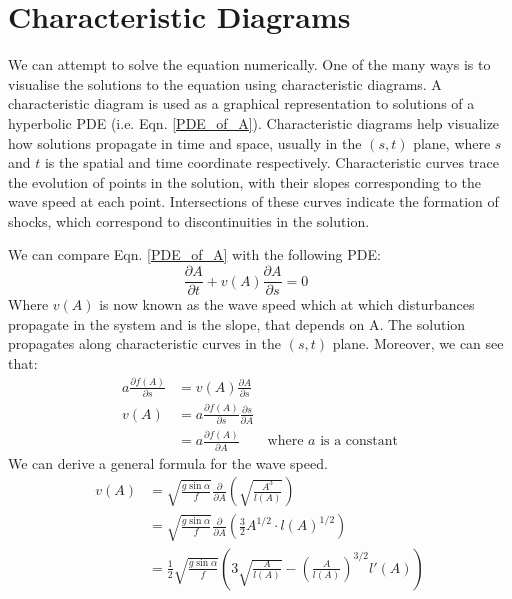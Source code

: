 \documentclass[12pt]{article}
\begin{document}
\section{Characteristic Diagrams}
\label{sec:characteristic}
We can attempt to solve the equation numerically. One of the many ways is to visualise the solutions to the equation using characteristic diagrams. A characteristic diagram is used as a graphical representation to solutions of a hyperbolic PDE (i.e. Eqn. \ref{PDE_of_A}). Characteristic diagrams help visualize how solutions propagate in time and space, usually in the $(s, t)$ plane, where $s$ and $t$ is the spatial and time coordinate respectively. Characteristic curves trace the evolution of points in the solution, with their slopes corresponding to the wave speed at each point. Intersections of these curves indicate the formation of shocks, which correspond to discontinuities in the solution.

We can compare Eqn. \ref{PDE_of_A} with the following PDE:
\begin{equation}
    \frac{\partial A}{\partial t} + v(A) \frac{\partial A}{\partial s} = 0\qquad 
\end{equation}
Where $v(A)$ is now known as the wave speed which at which disturbances propagate in the system and is the slope, that depends on A. The solution propagates along characteristic curves in the $(s, t)$ plane. Moreover, we can see that: 
\begin{equation}
    \begin{split}
        a \frac{\partial f(A)}{\partial s} &= v(A)\frac{\partial A}{\partial s}
        \\ v(A)  &= a \frac{\partial f(A)}{\partial s}\frac{\partial s}{\partial A}
        \\ &= a \frac{\partial f(A)}{\partial A} \qquad \text{where }a\text{ is a constant}
    \end{split}
\end{equation}
We can derive a general formula for the wave speed.
\begin{equation}
    \begin{split}
        v(A) &= \sqrt{\frac{g\sin \alpha}{f}}\frac{\partial}{\partial A}\left( \sqrt{\frac{A^3}{l(A)}}\right)
        \\&= \sqrt{\frac{g\sin \alpha}{f}}\frac{\partial}{\partial A}\left(\frac{3}{2}A^{1/2}\cdot l(A)^{1/2}\right)
        \\&= \frac{1}{2}\sqrt{\frac{g\sin \alpha}{f}}\left(3\sqrt{\frac{A}{l(A)}} - {\left(\frac{A}{l(A)}\right)^{3/2}}l'(A) \right)
    \end{split}
\end{equation}
\end{document}
